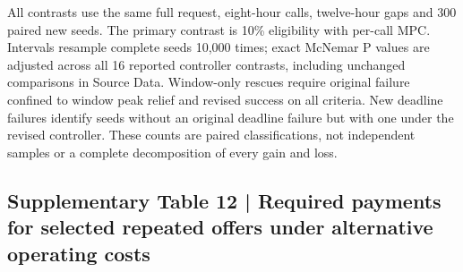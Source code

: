\documentclass[10pt,a4paper]{article}
\begin{document}
All contrasts use the same full request, eight-hour calls, twelve-hour gaps and 300 paired new seeds. The primary contrast is 10\% eligibility with per-call MPC. Intervals resample complete seeds 10,000 times; exact McNemar P values are adjusted across all 16 reported controller contrasts, including unchanged comparisons in Source Data. Window-only rescues require original failure confined to window peak relief and revised success on all criteria. New deadline failures identify seeds without an original deadline failure but with one under the revised controller. These counts are paired classifications, not independent samples or a complete decomposition of every gain and loss.


\pagebreak[2]
\subsection{Supplementary Table 12 | Required payments for selected repeated offers under alternative operating costs}
\end{document}
